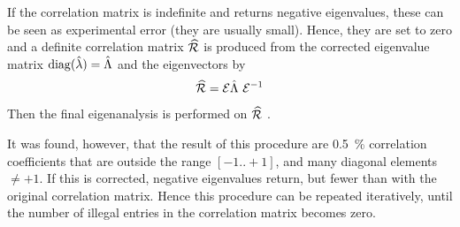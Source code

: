 If the correlation matrix  is indefinite and returns negative eigenvalues, these can be seen as experimental error (they are usually small). Hence, they are set to zero and a definite correlation matrix \(\widehat{\mathcal{R}} \) is produced from the corrected eigenvalue matrix \(\operatorname{diag}(\hat{\lambda}) = \hat{\Lambda} \) and the eigenvectors  by
\begin{equation}
  \widehat{\mathcal{R}} = \mathcal{E} \hat{\Lambda}\ \mathcal{E}^{-1}
\end{equation}
Then the final eigenanalysis is performed on \(\widehat{\mathcal{R}} \) \parencite{TL-07}.

It was found, however, that the result of this procedure are \SI{0.5}{\%} correlation coefficients that are outside the range \([-1..+1] \), and many diagonal elements \(\neq +1 \). If this is corrected, negative eigenvalues return, but fewer than with the original correlation matrix. Hence this procedure can be repeated iteratively, until the number of illegal entries in the correlation matrix becomes zero.


